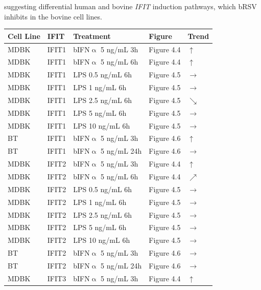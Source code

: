 suggesting differential human and bovine \textit{IFIT} induction pathways, which bRSV inhibits in the bovine cell lines.

\begin{table}
    \centering
    \begin{tabular}{lllll}
    \hline
        \textbf{Cell Line} & \textbf{IFIT} & \textbf{Treatment} & \textbf{Figure} & \textbf{Trend} \\ \hline
        MDBK & IFIT1 & bIFN$\upalpha$ 5 ng/mL 3h & Figure 4.4 & \(\uparrow\) \\ 
        MDBK & IFIT1 & bIFN$\upalpha$ 5 ng/mL 6h & Figure 4.4 & \(\uparrow\) \\ 
        MDBK & IFIT1 & LPS 0.5 ng/mL 6h & Figure 4.5 & \(\rightarrow\) \\ 
        MDBK & IFIT1 & LPS 1 ng/mL 6h & Figure 4.5 & \(\rightarrow\) \\ 
        MDBK & IFIT1 & LPS 2.5 ng/mL 6h & Figure 4.5 & \(\searrow\) \\ 
        MDBK & IFIT1 & LPS 5 ng/mL 6h & Figure 4.5 & \(\rightarrow\) \\ 
        MDBK & IFIT1 & LPS 10 ng/mL 6h & Figure 4.5 & \(\rightarrow\) \\ 
        BT & IFIT1 & bIFN$\upalpha$ 5 ng/mL 3h & Figure 4.6 & \(\uparrow\) \\ 
        BT & IFIT1 & bIFN$\upalpha$ 5 ng/mL 24h & Figure 4.6 & \(\rightarrow\) \\ 
        MDBK & IFIT2 & bIFN$\upalpha$ 5 ng/mL 3h & Figure 4.4 & \(\uparrow\) \\ 
        MDBK & IFIT2 & bIFN$\upalpha$ 5 ng/mL 6h & Figure 4.4 & \(\nearrow\) \\ 
        MDBK & IFIT2 & LPS 0.5 ng/mL 6h & Figure 4.5 & \(\rightarrow\) \\ 
        MDBK & IFIT2 & LPS 1 ng/mL 6h & Figure 4.5 & \(\rightarrow\) \\ 
        MDBK & IFIT2 & LPS 2.5 ng/mL 6h & Figure 4.5 & \(\rightarrow\) \\ 
        MDBK & IFIT2 & LPS 5 ng/mL 6h & Figure 4.5 & \(\rightarrow\) \\ 
        MDBK & IFIT2 & LPS 10 ng/mL 6h & Figure 4.5 & \(\rightarrow\) \\ 
        BT & IFIT2 & bIFN$\upalpha$ 5 ng/mL 3h & Figure 4.6 & \(\rightarrow\) \\ 
        BT & IFIT2 & bIFN$\upalpha$ 5 ng/mL 24h & Figure 4.6 & \(\rightarrow\) \\ 
        MDBK & IFIT3 & bIFN$\upalpha$ 5 ng/mL 3h & Figure 4.4 & \(\uparrow\) \\ 

\end{tabular}
\end{table}

